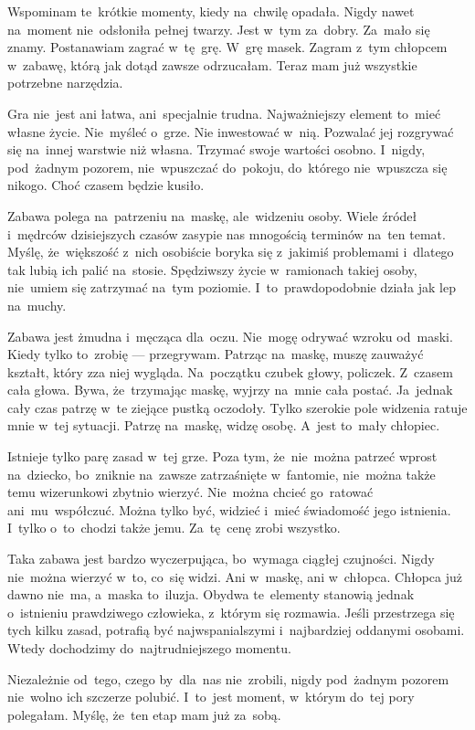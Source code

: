 \documentclass[9pt, a5paper]{memoir}
\begin{document}
Wspominam te~krótkie momenty, kiedy na~chwilę opadała. Nigdy nawet na~moment nie~odsłoniła pełnej twarzy. Jest w~tym za~dobry. Za~mało się znamy. Postanawiam zagrać w~tę~grę. W~grę masek. Zagram z~tym chłopcem w~zabawę, którą jak dotąd zawsze odrzucałam. Teraz mam już wszystkie potrzebne narzędzia.

Gra nie~jest ani łatwa, ani~specjalnie trudna. Najważniejszy element to~mieć własne życie. Nie~myśleć o~grze. Nie inwestować w~nią. Pozwalać jej rozgrywać się na~innej warstwie niż własna. Trzymać swoje wartości osobno. I~nigdy, pod~żadnym pozorem, nie~wpuszczać do~pokoju, do~którego nie~wpuszcza się nikogo. Choć czasem będzie kusiło.

Zabawa polega na~patrzeniu na~maskę, ale~widzeniu osoby. Wiele źródeł i~mędrców dzisiejszych czasów zasypie nas mnogością terminów na~ten temat. Myślę, że~większość z~nich osobiście boryka się z~jakimiś problemami i~dlatego tak lubią ich palić na~stosie. Spędziwszy życie w~ramionach takiej osoby, nie~umiem się zatrzymać na~tym poziomie. I~to~prawdopodobnie działa jak lep na~muchy.

Zabawa jest żmudna i~męcząca dla~oczu. Nie~mogę odrywać wzroku od~maski. Kiedy tylko to~zrobię --- przegrywam. Patrząc na~maskę, muszę zauważyć kształt, który zza niej wygląda. Na~początku czubek głowy, policzek. Z~czasem cała głowa. Bywa, że~trzymając maskę, wyjrzy na~mnie cała postać. Ja~jednak cały czas patrzę w~te ziejące pustką oczodoły. Tylko szerokie pole widzenia ratuje mnie w~tej sytuacji. Patrzę na~maskę, widzę osobę. A~jest to~mały chłopiec.

Istnieje tylko parę zasad w~tej grze. Poza tym, że~nie~można patrzeć wprost na~dziecko, bo~zniknie na~zawsze zatrzaśnięte w~fantomie, nie~można także temu wizerunkowi zbytnio wierzyć. Nie~można chcieć go~ratować ani~mu~współczuć. Można tylko być, widzieć i~mieć świadomość jego istnienia. I~tylko o~to~chodzi także jemu. Za~tę~cenę zrobi wszystko.

Taka zabawa jest bardzo wyczerpująca, bo~wymaga ciągłej czujności. Nigdy nie~można wierzyć w~to, co~się widzi. Ani w~maskę, ani w~chłopca. Chłopca już dawno nie~ma, a~maska to~iluzja. Obydwa te~elementy stanowią jednak o~istnieniu prawdziwego człowieka, z~którym się rozmawia. Jeśli przestrzega się tych kilku zasad, potrafią być najwspanialszymi i~najbardziej oddanymi osobami. Wtedy dochodzimy do~najtrudniejszego momentu.

Niezależnie od~tego, czego by~dla~nas nie~zrobili, nigdy pod~żadnym pozorem nie~wolno ich szczerze polubić. I~to~jest moment, w~którym do~tej pory polegałam. Myślę, że~ten etap mam już za~sobą.
\end{document}

